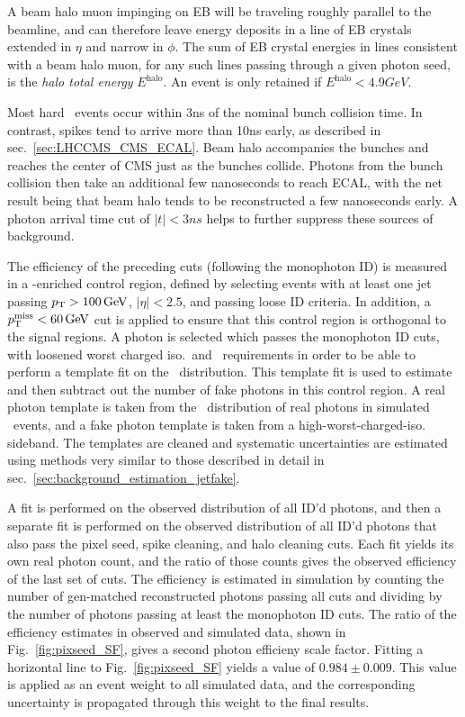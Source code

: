 A beam halo muon impinging on EB will be traveling roughly parallel to the beamline, and can therefore leave energy deposits in a line of EB crystals extended in $\eta$ and narrow in $\phi$.
The sum of EB crystal energies in lines consistent with a beam halo muon, for any such lines passing through a given photon seed,
is the \textit{halo total energy} $E^\mathrm{halo}$. An event is only retained if $E^\mathrm{halo} < 4.9\unit{GeV}$.

Most hard \zinvg\ events occur within 3\unit{ns} of the nominal bunch collision time. In contrast, spikes tend to arrive more than 10\unit{ns} early, as described in sec.~\ref{sec:LHCCMS_CMS_ECAL}.
Beam halo accompanies the bunches and reaches the center of CMS just as the bunches collide. Photons from the bunch collision then take an additional few nanoseconds to reach ECAL,
with the net result being that beam halo tends to be reconstructed a few nanoseconds early. A photon arrival time cut of $|t| < 3\unit{ns}$ helps to further suppress these sources of background.

The efficiency of the preceding cuts (following the monophoton ID) is measured in a \gjets-enriched control region, defined by selecting events with at least one jet passing $\pT > 100\unit{GeV}$,
$|\eta| < 2.5$, and passing loose ID criteria. In addition, a $\MET < 60\unit{GeV}$ cut is applied to ensure that this control region is orthogonal to the signal regions. A photon
is selected which passes the monophoton ID cuts, with loosened worst charged iso.\ and \sieie\ requirements in order to be able to perform a template fit on the \sieie\ distribution.
This template fit is used to estimate and then subtract out the number of fake photons in this control region. A real photon template is taken from the \sieie\ distribution of real photons in
simulated \gjets\ events, and a fake photon template is taken from a high-worst-charged-iso. sideband. The templates are cleaned and systematic uncertainties are estimated using methods
very similar to those described in detail in sec.~\ref{sec:background_estimation_jetfake}.

A fit is performed on the observed distribution of all ID'd photons, and then a separate fit is performed on the observed distribution of
all ID'd photons that also pass the pixel seed, spike cleaning, and halo cleaning cuts. Each fit yields its own real photon count, and the ratio of those counts gives the observed efficiency
of the last set of cuts. The efficiency is estimated in simulation by counting the number of gen-matched reconstructed photons passing all cuts and
dividing by the number of photons passing at least the monophoton ID cuts. The ratio of the efficiency estimates in observed and simulated data, shown in Fig.~\ref{fig:pixseed_SF},
gives a second photon efficieny scale factor. Fitting a horizontal line to Fig.~\ref{fig:pixseed_SF} yields a value of $0.984 \pm 0.009$. This value is applied
as an event weight to all simulated data, and the corresponding uncertainty is propagated through this weight to the final results.

